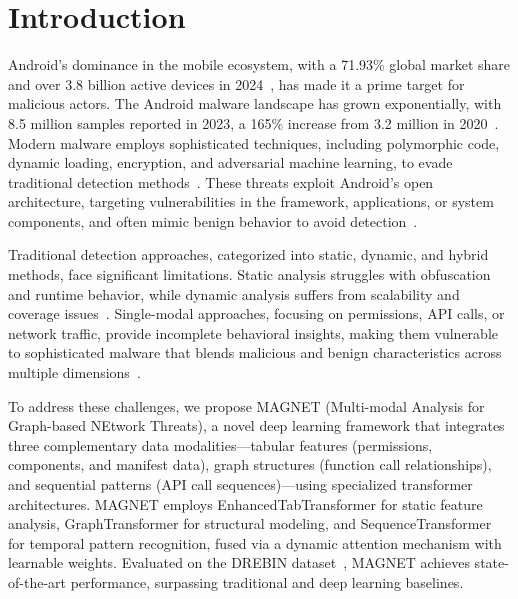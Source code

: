 \documentclass[10pt,conference]{IEEEtran}
\begin{document}
\section{Introduction}
Android’s dominance in the mobile ecosystem, with a 71.93\% global market share and over 3.8 billion active devices in 2024~\cite{AndroidMarketShare2024}, has made it a prime target for malicious actors. The Android malware landscape has grown exponentially, with 8.5 million samples reported in 2023, a 165\% increase from 3.2 million in 2020~\cite{AVTestReport2023,MalwareStatistics2023}. Modern malware employs sophisticated techniques, including polymorphic code, dynamic loading, encryption, and adversarial machine learning, to evade traditional detection methods~\cite{ObfuscationTechniques2023,ZeroDayThreats2023,AdversarialML2023}. These threats exploit Android’s open architecture, targeting vulnerabilities in the framework, applications, or system components, and often mimic benign behavior to avoid detection~\cite{BehavioralMimicry2023}.

Traditional detection approaches, categorized into static, dynamic, and hybrid methods, face significant limitations. Static analysis struggles with obfuscation and runtime behavior, while dynamic analysis suffers from scalability and coverage issues~\cite{StaticAnalysisLimitations2023,DynamicAnalysisConstraints2023}. Single-modal approaches, focusing on permissions, API calls, or network traffic, provide incomplete behavioral insights, making them vulnerable to sophisticated malware that blends malicious and benign characteristics across multiple dimensions~\cite{SingleModalLimitations2023}.

To address these challenges, we propose MAGNET (Multi-modal Analysis for Graph-based NEtwork Threats), a novel deep learning framework that integrates three complementary data modalities—tabular features (permissions, components, and manifest data), graph structures (function call relationships), and sequential patterns (API call sequences)—using specialized transformer architectures. MAGNET employs EnhancedTabTransformer for static feature analysis, GraphTransformer for structural modeling, and SequenceTransformer for temporal pattern recognition, fused via a dynamic attention mechanism with learnable weights. Evaluated on the DREBIN dataset~\cite{Drebin}, MAGNET achieves state-of-the-art performance, surpassing traditional and deep learning baselines.
\end{document}
